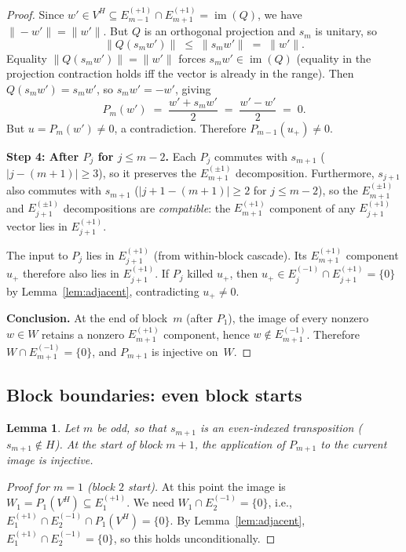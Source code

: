 \documentclass[11pt]{article}
\newtheorem{lemma}[theorem]{Lemma}
\theoremstyle{definition}
\theoremstyle{remark}
\newcommand{\im}{\operatorname{im}}
\begin{document}
\begin{proof}
Since $w' \in V^H \subseteq E_{m-1}^{(+1)} \cap E_{m+1}^{(+1)}
= \im(Q)$, we have $\|-w'\| = \|w'\|$. But $Q$ is an
orthogonal projection and $s_m$ is unitary, so
\[
  \|Q(s_m w')\| \;\le\; \|s_m w'\| \;=\; \|w'\|.
\]
Equality $\|Q(s_m w')\| = \|w'\|$ forces $s_m w' \in \im(Q)$
(equality in the projection contraction holds iff the vector
is already in the range). Then $Q(s_m w') = s_m w'$, so
$s_m w' = -w'$, giving
\[
  P_m(w') \;=\; \frac{w' + s_m w'}{2} \;=\; \frac{w' - w'}{2}
  \;=\; 0.
\]
But $u = P_m(w') \ne 0$, a contradiction.
Therefore $P_{m-1}(u_+) \ne 0$.

\medskip\noindent\textbf{Step 4: After $P_j$ for $j \le m{-}2$.}
Each $P_j$ commutes with $s_{m+1}$ ($|j - (m{+}1)| \ge 3$),
so it preserves the $E_{m+1}^{(\pm 1)}$ decomposition.
Furthermore, $s_{j+1}$ also commutes with $s_{m+1}$
($|j{+}1 - (m{+}1)| \ge 2$ for $j \le m{-}2$), so the
$E_{m+1}^{(\pm 1)}$ and $E_{j+1}^{(\pm 1)}$ decompositions
are \emph{compatible}: the $E_{m+1}^{(+1)}$ component of
any $E_{j+1}^{(+1)}$ vector lies in $E_{j+1}^{(+1)}$.

The input to $P_j$ lies in $E_{j+1}^{(+1)}$ (from within-block
cascade). Its $E_{m+1}^{(+1)}$ component $u_+$ therefore
also lies in $E_{j+1}^{(+1)}$. If $P_j$ killed $u_+$,
then $u_+ \in E_j^{(-1)} \cap E_{j+1}^{(+1)} = \{0\}$
by Lemma~\ref{lem:adjacent}, contradicting $u_+ \ne 0$.

\medskip\noindent\textbf{Conclusion.}
At the end of block~$m$ (after $P_1$), the image of every
nonzero $w \in W$ retains a nonzero $E_{m+1}^{(+1)}$ component,
hence $w \notin E_{m+1}^{(-1)}$. Therefore
$W \cap E_{m+1}^{(-1)} = \{0\}$, and $P_{m+1}$ is injective
on~$W$.
\end{proof}

\subsection{Block boundaries: even block starts}

\begin{lemma}\label{lem:even-boundary}
Let $m$ be odd, so that $s_{m+1}$ is an even-indexed transposition
($s_{m+1} \notin H$). At the start of block $m{+}1$, the
application of $P_{m+1}$ to the current image is injective.
\end{lemma}

\begin{proof}[Proof for $m = 1$ (block $2$ start)]
At this point the image is $W_1 = P_1(V^H) \subseteq E_1^{(+1)}$.
We need $W_1 \cap E_2^{(-1)} = \{0\}$, i.e.,
$E_1^{(+1)} \cap E_2^{(-1)} \cap P_1(V^H) = \{0\}$.
By Lemma~\ref{lem:adjacent}, $E_1^{(+1)} \cap E_2^{(-1)} = \{0\}$,
so this holds unconditionally.
\end{proof}
\end{document}

